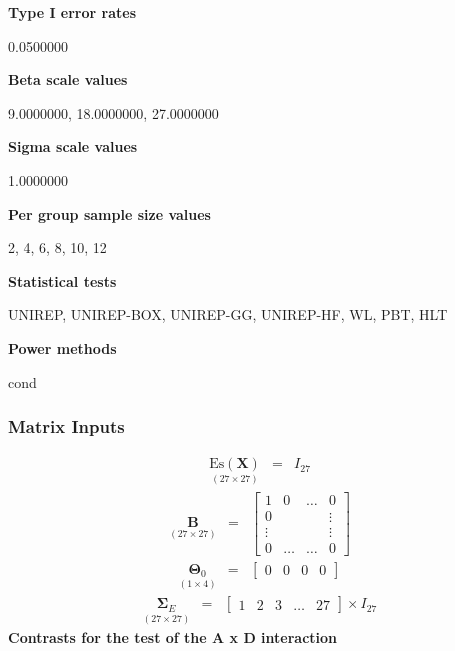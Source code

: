 \documentclass{glimmpse-report}
\begin{document}
{\bf Type I error rates}

0.0500000

{\bf Beta scale values}

9.0000000, 18.0000000, 27.0000000

{\bf Sigma scale values}

1.0000000

{\bf Per group sample size values}

2, 4, 6, 8, 10, 12

{\bf Statistical tests}

UNIREP, UNIREP-BOX, UNIREP-GG, UNIREP-HF, WL, PBT, HLT

{\bf Power methods}

cond

\subsubsection{Matrix Inputs}

\begin{eqnarray*}
\underset{\left(27\times27\right)}{\text{Es}\left(\mathbf{X}\right)} & = & I_{27}
\end{eqnarray*}
\begin{eqnarray*}
\underset{\left(27\times27\right)}{\mathbf{B}} & = & \begin{bmatrix}1 & 0 & \ldots & 0\\
0 &  &  & \vdots\\
\vdots &  &  & \vdots\\
0 & \ldots & \ldots & 0
\end{bmatrix}
\end{eqnarray*}
\begin{eqnarray*}
\underset{\left(1\times4\right)}{\mathbf{\Theta}_{0}} & = & \begin{bmatrix}0 & 0 & 0 & 0
\end{bmatrix}
\end{eqnarray*}
\begin{eqnarray*}
\underset{\left(27\times27\right)}{\mathbf{\Sigma}_{E}} & = & \begin{bmatrix}1 & 2 & 3 & \ldots & 27
\end{bmatrix} \times I_{27}
\end{eqnarray*}
\newpage\textbf{Contrasts for the test of the A x D interaction}
\end{document}

